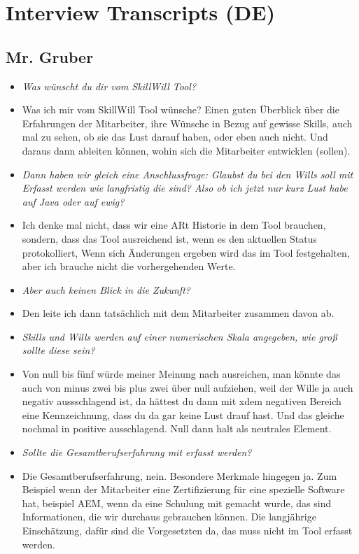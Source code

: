 \cleardoublepage

\appendix

\chapter{Interview Transcripts (DE)}

\section{Mr. Gruber}
\begin{itemize}
\item[] \textit{Was wünscht du dir vom SkillWill Tool?}
\item[] Was ich mir vom SkillWill Tool wünsche? Einen guten Überblick über die Erfahrungen der Mitarbeiter, ihre Wünsche in Bezug auf gewisse Skills, auch mal zu sehen, ob sie das Lust darauf haben, oder eben auch nicht. Und daraus dann ableiten können, wohin sich die Mitarbeiter entwicklen (sollen).

\item[] \textit{Dann haben wir gleich eine Anschlussfrage: Glaubst du bei den Wills soll mit Erfasst werden wie langfristig die sind? Also ob ich jetzt nur kurz Lust habe auf Java oder auf ewig?}
\item[] Ich denke mal nicht, dass wir eine ARt Historie in dem Tool brauchen, sondern, dass das Tool ausreichend ist, wenn es den aktuellen Status protokolliert, Wenn sich Änderungen ergeben wird das im Tool festgehalten, aber ich brauche nicht die vorhergehenden Werte.

\item[] \textit{Aber auch keinen Blick in die Zukunft?}
\item[] Den leite ich dann tatsächlich mit dem Mitarbeiter zusammen davon ab.

\item[] \textit{Skills und Wills werden auf einer numerischen Skala angegeben, wie groß sollte diese sein?}
\item[] Von null bis fünf würde meiner Meinung nach ausreichen, man könnte das auch von minus zwei bis plus zwei über null aufziehen, weil der Wille ja auch negativ aussschlagend ist, da hättest du dann mit xdem negativen Bereich eine Kennzeichnung, dass du da gar keine Lust drauf hast. Und das gleiche nochmal in positive ausschlagend. Null dann halt als neutrales Element.

\item[] \textit{Sollte die Gesamtberufserfahrung mit erfasst werden?}
\item[] Die Gesamtberufserfahrung, nein. Besondere Merkmale hingegen ja. Zum Beispiel wenn der Mitarbeiter eine Zertifizierung für eine spezielle Software hat, beispiel AEM, wenn da eine Schulung mit gemacht wurde, das sind Informationen, die wir durchaus gebrauchen können.  Die langjährige Einschätzung, dafür sind die Vorgesetzten da, das muss nicht im Tool erfasst werden.


\end{itemize}
